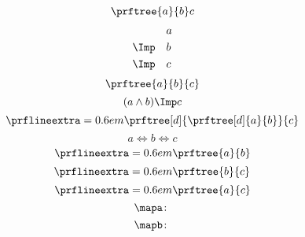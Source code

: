 {\begin{forslides}
\begin{equation*}
            {\prftree
                {a}
                {b}}
            {c}
        \end{equation*}
        \begin{equation*}
            \label{eq:abc_2}
            \begin{aligned}
                           & a \\
                \Imp \quad & b \\
                \Imp \quad & c
            \end{aligned}
        \end{equation*}
        \begin{equation*}
            \label{eq:abc_3}
            \prftree{a}{b}{c}
        \end{equation*}
        \begin{equation*}
            \label{eq:abc_4}
            (a\wedge b)\Imp c
        \end{equation*}
        \begin{equation*}
            \label{eq:abc_5}
            \prflineextra=0.6em
            \prftree[d]
            {\prftree[d]
                {a}
                {b}}
            {c}
        \end{equation*}
        \begin{equation*}
            \label{eq:abc_6}
            a\Leftrightarrow b \Leftrightarrow c
        \end{equation*}
        \begin{equation*}
            \label{eq:abc_7}
            \prflineextra=0.6em
            \prftree{a}{b}
        \end{equation*}
        \begin{equation*}
            \label{eq:abc_8}
            \prflineextra=0.6em
            \prftree{b}{c}
        \end{equation*}
        \begin{equation*}
            \label{eq:abc_9}
            \prflineextra=0.6em
            \prftree{a}{c}
        \end{equation*}
        \begin{equation*}
            \label{eq:mapf}
            \mapa \colon
        \end{equation*}
        \begin{equation*}
            \label{eq:mapg}
            \mapb \colon
        \end{equation*}
        \begin{equation*}
            \label{eq:mapcomp}

\end{equation*}
\end{forslides}}
